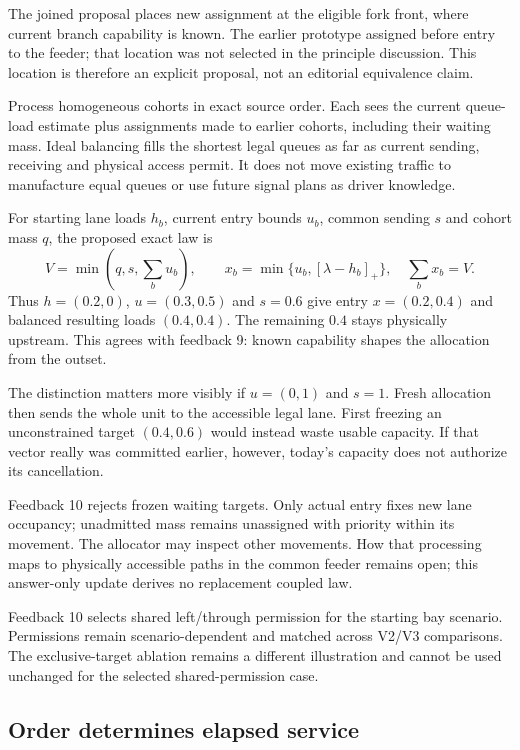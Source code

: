 \documentclass[11pt,a4paper]{article}
\begin{document}
The joined proposal places new assignment at the eligible fork front,
where current branch capability is known. The earlier prototype assigned
before entry to the feeder; that location was not selected in the principle
discussion. This location is therefore an explicit proposal, not an
editorial equivalence claim.

Process homogeneous cohorts in exact source order. Each sees the current
queue-load estimate plus assignments made to earlier cohorts, including
their waiting mass. Ideal balancing fills the shortest legal queues as
far as current sending, receiving and physical access permit. It does not
move existing traffic to manufacture equal queues or use future signal
plans as driver knowledge.

For starting lane loads $h_b$, current entry bounds $u_b$, common sending
$s$ and cohort mass $q$, the proposed exact law is
\begin{equation}
 V=\min(q,s,\sum_bu_b),\qquad
 x_b=\min\{u_b,[\lambda-h_b]_+\},\quad \sum_bx_b=V.
 \label{eq:compact-allocation}
\end{equation}
Thus $h=(0.2,0)$, $u=(0.3,0.5)$ and $s=0.6$ give entry
$x=(0.2,0.4)$ and balanced resulting loads $(0.4,0.4)$.
The remaining $0.4$ stays physically upstream. This agrees with feedback 9:
known capability shapes the allocation from the outset.

The distinction matters more visibly if $u=(0,1)$ and $s=1$. Fresh allocation
then sends the whole unit to the accessible legal lane. First freezing an
unconstrained target $(0.4,0.6)$ would instead waste usable capacity.
If that vector really was committed earlier, however, today's capacity
does not authorize its cancellation.

Feedback 10 rejects frozen waiting targets. Only actual entry fixes new
lane occupancy; unadmitted mass remains unassigned with priority within its
movement. The allocator may inspect other movements. How that processing
maps to physically accessible paths in the common feeder remains open;
this answer-only update derives no replacement coupled law.

Feedback 10 selects shared left/through permission for the starting bay
scenario. Permissions remain scenario-dependent and matched across V2/V3
comparisons. The exclusive-target ablation remains a different illustration
and cannot be used unchanged for the selected shared-permission case.

\subsection*{Order determines elapsed service}
\end{document}
